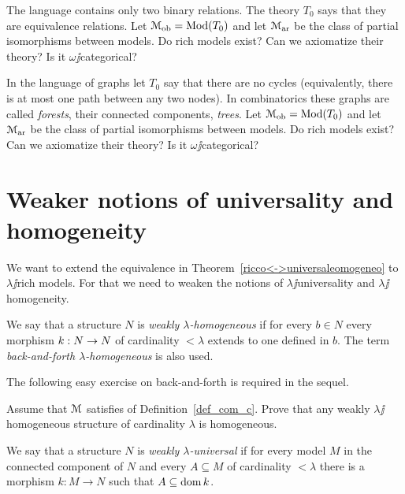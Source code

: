 \documentclass[creche.tex]{subfiles}
\begin{document}
\begin{exercise}
The language contains only two binary relations. The theory $T_0$ says that they are equivalence relations. Let $\EuScript M_{\rm ob}=\mathop{\rm Mod}(T_0)$ and let $\EuScript M_{\rm ar}$ be the class of partial isomorphisms between models. Do rich models exist? Can we axiomatize their theory? Is it $\omega\jj$categorical?\QED
\end{exercise}

\begin{exercise}
In the language of graphs let $T_0$ say that there are no cycles (equivalently, there is at most one path between any two nodes). In combinatorics these graphs are called \textit{forests}, their connected components, \textit{trees}. Let $\EuScript M_{\rm ob}=\mathop{\rm Mod}(T_0)$ and let $\EuScript M_{\rm ar}$  be the class of partial isomorphisms between models. Do rich models exist? Can we axiomatize their theory? Is it $\omega\jj$categorical?\QED
\end{exercise}

\section{Weaker notions of universality and homogeneity}\label{weak}

We want to extend the equivalence in Theorem~\ref{ricco<->universaleomogeneo} to $\lambda\jj$rich models. For that we need to weaken the notions of $\lambda\jj$universality and  $\lambda\jj$homogeneity. 

\begin{definition}
We say that a structure $N$ is \emph{weakly $\lambda$-homogeneous\/} if for every $b\in N$ every morphism $k:N\rightarrow N$ of cardinality $<\lambda$ extends to one defined in $b$. The term \emph{back-and-forth $\lambda$-homogeneous\/} is also used.\QED
\end{definition}

The following easy exercise on back-and-forth is required in the sequel.

\begin{exercise}\label{omogeneo=debolmenteaomogeneo}
Assume that $\EuScript M$ satisfies  of Definition~\ref{def_com_c}. Prove that any weakly $\lambda\jj$ho\-mo\-ge\-ne\-ous structure of cardinality $\lambda$ is homogeneous.\QED
\end{exercise}

\begin{definition}\label{def_weakly_universal}
We say that a structure $N$ is \emph{weakly $\lambda$-universal\/} if for every model $M$ in the connected component of $N$ and every $A\subseteq M$ of cardinality $<\lambda$ there is a morphism $k:M\to N$ such that $A\subseteq\mathop{\rm dom} k$.\QED
\end{definition}
\end{document}
